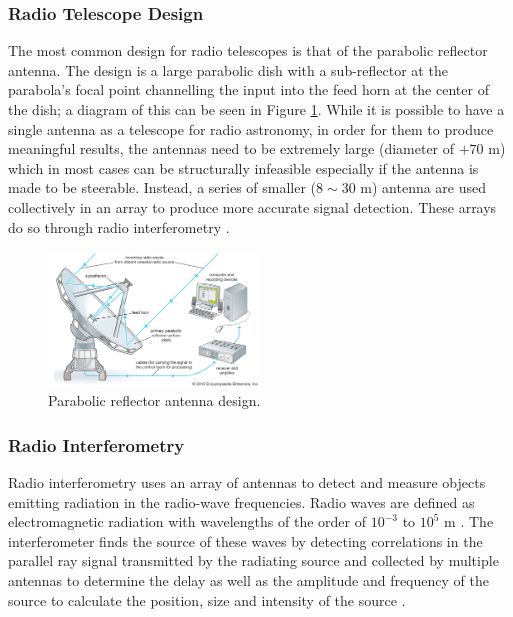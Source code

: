 \subsubsection{Radio Telescope Design}
The most common design for radio telescopes is that of the parabolic reflector antenna. The design is a large parabolic dish with a sub-reflector at the parabola's focal point channelling the input into the feed horn at the center of the dish; a diagram of this can be seen in Figure \ref{ra:fig:para}. While it is possible to have a single antenna as a telescope for radio astronomy, in order for them to produce meaningful results, the antennas need to be extremely large (diameter of $+70$ m) which in most cases can be structurally infeasible especially if the antenna is made to be steerable. Instead, a series of smaller ($8\sim30$ m) antenna are used collectively in an array to produce more accurate signal detection. These arrays do so through radio interferometry \citep{cheng2009radio}.
%
\begin{figure}[H]
	\centering
	\includegraphics[width=0.5\textwidth]{Images/Telescope.jpg}
	\caption[]{Parabolic reflector antenna design\footnotemark.}
	\label{ra:fig:para}
\end{figure}
%
\subsubsection{Radio Interferometry}\label{ra:ssec:des}
Radio interferometry uses an array of antennas to detect and measure objects emitting radiation in the radio-wave frequencies. Radio waves are defined as electromagnetic radiation with wavelengths of the order of $10^{-3}$ to $10^5$ m \citep{cheng2009radio}. The interferometer finds the source of these waves by detecting correlations in the parallel ray signal transmitted by the radiating source \citep{tasse2016tessellation} and collected by multiple antennas to determine the delay as well as the amplitude and frequency of the source to calculate the position, size and intensity of the source \citep{thompson2008interferometry}.
%
